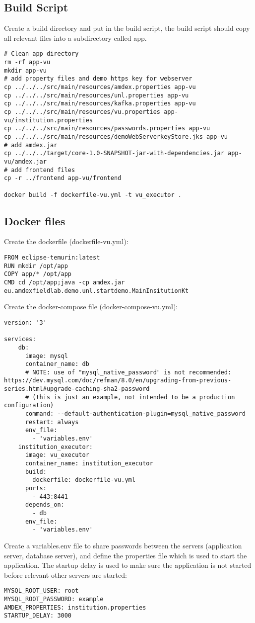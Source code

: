 \documentclass{article}
\begin{document}
\subsection{Build Script}
Create a build directory and put in the build script, the build script should copy all relevant files into a subdirectory called app.
\begin{verbatim}
# Clean app directory
rm -rf app-vu
mkdir app-vu
# add property files and demo https key for webserver
cp ../../../src/main/resources/amdex.properties app-vu
cp ../../../src/main/resources/unl.properties app-vu
cp ../../../src/main/resources/kafka.properties app-vu
cp ../../../src/main/resources/vu.properties app-vu/institution.properties
cp ../../../src/main/resources/passwords.properties app-vu
cp ../../../src/main/resources/demoWebServerkeyStore.jks app-vu
# add amdex.jar
cp ../../../target/core-1.0-SNAPSHOT-jar-with-dependencies.jar app-vu/amdex.jar
# add frontend files
cp -r ../frontend app-vu/frontend

docker build -f dockerfile-vu.yml -t vu_executor .
\end{verbatim}
\subsection{Docker files}
Create the dockerfile (dockerfile-vu.yml):
\begin{verbatim}
FROM eclipse-temurin:latest
RUN mkdir /opt/app
COPY app/* /opt/app
CMD cd /opt/app;java -cp amdex.jar eu.amdexfieldlab.demo.unl.startdemo.MainInsitutionKt
\end{verbatim}
Create the docker-compose file (docker-compose-vu.yml):
\begin{verbatim}
version: '3'

services:
    db:
      image: mysql
      container_name: db
      # NOTE: use of "mysql_native_password" is not recommended: https://dev.mysql.com/doc/refman/8.0/en/upgrading-from-previous-series.html#upgrade-caching-sha2-password
      # (this is just an example, not intended to be a production configuration)
      command: --default-authentication-plugin=mysql_native_password
      restart: always
      env_file:
        - 'variables.env'
    institution_executor:
      image: vu_executor
      container_name: institution_executor
      build:
        dockerfile: dockerfile-vu.yml
      ports:
        - 443:8441
      depends_on:
        - db
      env_file:
        - 'variables.env'
\end{verbatim}
Create a variables.env file to share passwords between the servers (application server, database server), and define the properties file which is used to start the application. The startup delay is used to make sure the application is not started before relevant other servers are started:
\begin{verbatim}
MYSQL_ROOT_USER: root
MYSQL_ROOT_PASSWORD: example
AMDEX_PROPERTIES: institution.properties
STARTUP_DELAY: 3000
\end{verbatim}
\end{document}
